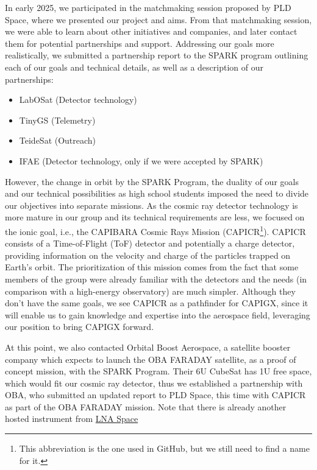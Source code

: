 \documentclass[arxiv,usenatbib]{iupartex}
\begin{document}
In early 2025, we participated in the matchmaking session proposed by PLD Space, where we presented our project and aims. From that matchmaking session, we were able to learn about other initiatives and companies, and later contact them for potential partnerships and support. Addressing our goals more realistically, we submitted a partnership report to the SPARK program outlining each of our goals and technical details, as well as a description of our partnerships:
\begin{itemize}
    \item LabOSat (Detector technology)
    \item TinyGS (Telemetry)
    \item TeideSat (Outreach)
    \item IFAE (Detector technology, only if we were accepted by SPARK)
\end{itemize}

However, the change in orbit by the SPARK Program, the duality of our goals and our technical possibilities as high school students imposed the need to divide our objectives into separate missions. As the cosmic ray detector technology is more mature in our group and its technical requirements are less, we focused on the ionic goal, i.e., the CAPIBARA Cosmic Rays Mission (CAPICR\footnote{This abbreviation is the one used in GitHub, but we still need to find a name for it.}). CAPICR consists of a Time-of-Flight (ToF) detector and potentially a charge detector, providing information on the velocity and charge of the particles trapped on Earth's orbit. The prioritization of this mission comes from the fact that some members of the group were already familiar with the detectors and the needs (in comparison with a high-energy observatory) are much simpler. Although they don't have the same goals, we see CAPICR as a pathfinder for CAPIGX, since it will enable us to gain knowledge and expertise into the aerospace field, leveraging our position to bring CAPIGX forward.

At this point, we also contacted Orbital Boost Aerospace, a satellite booster company which expects to launch the OBA FARADAY satellite, as a proof of concept mission, with the SPARK Program. Their 6U CubeSat has 1U free space, which would fit our cosmic ray detector, thus we established a partnership with OBA, who submitted an updated report to PLD Space, this time with CAPICR as part of the OBA FARADAY mission. Note that there is already another hosted instrument from \href{https://www.lnaspace.com}{LNA Space}
\end{document}
